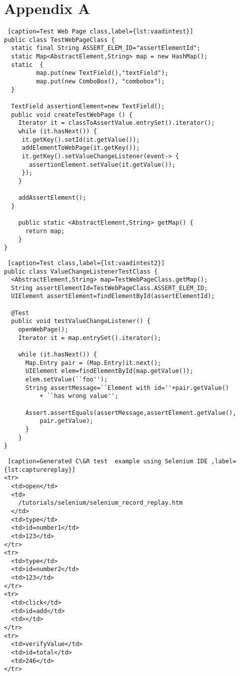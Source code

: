 	
\appendix
\section{Appendix A}
\label{appendixA}

\lstset{style=a1listing}
\begin{lstlisting} [caption=Test Web Page class,label={lst:vaadintest}]
public class TestWebPageClass {
  static final String ASSERT_ELEM_ID="assertElementId";
  static Map<AbstractElement,String> map = new HashMap();
  static  {
         map.put(new TextField(),"textField");
         map.put(new ComboBox(), "combobox");
  }
  
  TextField assertionElement=new TextField();
  public void createTestWebPage () {
    Iterator it = classToAssertValue.entrySet().iterator();
    while (it.hasNext()) {
     it.getKey().setId(it.getValue());
     addElementToWebPage(it.getKey());
     it.getKey().setValueChangeListener(event-> {
       assertionElement.setValue(it.getValue());
     });
    }
    
    addAssertElement();
  }  
    
    public static <AbstractElement,String> getMap() {
      return map;
    }
}
\end{lstlisting}

\lstset{style=a1listing}      
\begin{lstlisting} [caption=Test class,label={lst:vaadintest2}]
public class ValueChangeListenerTestClass {
  <AbstractElement,String> map=TestWebPageClass.getMap();
  String assertElementId=TestWebPageClass.ASSERT_ELEM_ID;
  UIElement assertElement=findElementById(assertElementId);
       
  @Test
  public void testValueChangeListener() {
    openWebPage();
    Iterator it = map.entrySet().iterator();
          
    while (it.hasNext()) {
      Map.Entry pair = (Map.Entry)it.next();
      UIElement elem=findElementById(map.getValue());
      elem.setValue(``foo'');
      String assertMessage=``Element with id=''+pair.getValue()
          + ``has wrong value'';
        
      Assert.assertEquals(assertMessage,assertElement.getValue(),
          pair.getValue);
      }
    }
}
\end{lstlisting}




\lstset{style=console}
\begin{lstlisting} [caption=Generated C\&R test  example using Selenium IDE ,label={lst:capturereplay}]
<tr> 
  <td>open</td>
  <td>
    /tutorials/selenium/selenium_record_replay.htm
  </td>
  <td>type</td>
  <td>id=number1</td>
  <td>123</td>
</tr>
<tr>
  <td>type</td>
  <td>id=number2</td>
  <td>123</td>
</tr>
<tr>
  <td>click</td>
  <td>id=add</td>
  <td></td>
</tr>
<tr>
  <td>verifyValue</td>
  <td>id=total</td>
  <td>246</td>
</tr>
\end{lstlisting}
	 
